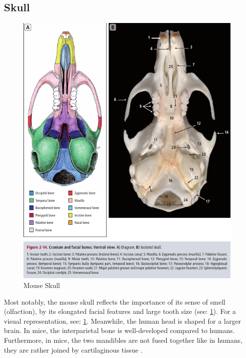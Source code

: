 \subsection{Skull}\label{s:b-mouse-skull}
\begin{figure}[h]
	\centerline{
		\includegraphics[scale=0.6]{images/mouseSkull.png}}
	\caption{Mouse Skull \cite{ruberteBridgingMouseHuman2023}}\label{fig:mouseSkull}
\end{figure}

\noindent
Most notably, the mouse skull reflects the importance of its sense of smell (olfaction),
by its elongated facial features and large tooth size (see: \cref{fig:mouseSkull}).
For a visual representation, see: \cref{fig:mouseSkull}.
Meanwhile, the human head is shaped for a larger brain.
In mice, the interparietal bone is well-developed compared to humans.
Furthermore, in mice, the two mandibles are not fused together like in humans,
they are rather joined by cartilaginous tissue \cite{jeromeSkeletalSystem2018,halleOpenAnatomyBrowser2017,platzerTaschenatlasAnatomieBd2013}.

